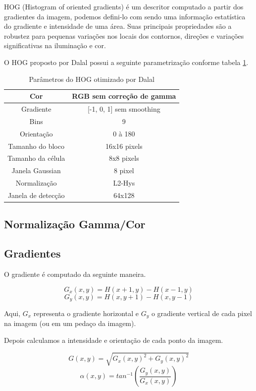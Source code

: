 HOG (Histogram of oriented gradients) é um descritor computado a partir dos gradientes da imagem, podemos defini-lo com sendo uma informação estatística do gradiente e intensidade de uma área. Suas principais propriedades são a robustez para pequenas variações nos locais dos contornos, direções e variações significativas na iluminação e cor.

O HOG proposto por Dalal \cite{dalal} possui a seguinte parametrização conforme tabela \ref{table:dlal_hog}.

\begin{table}[h]
\centering
\begin{tabular}{|c|c|}
\hline Cor & RGB sem correção de gamma \\ 
\hline Gradiente & [-1, 0, 1] sem smoothing \\ 
\hline Bins & 9 \\
\hline Orientação & 0 à 180 \\
\hline Tamanho do bloco & 16x16 pixels \\
\hline Tamanho da célula & 8x8 pixels \\
\hline Janela Gaussian & 8 pixel \\
\hline Normalização & L2-Hys \\
\hline Janela de detecção & 64x128 \\
\hline 
\end{tabular} 
\caption{Parâmetros do HOG otimizado por Dalal}
\label{table:dlal_hog}
\end{table}

\subsection{Normalização Gamma/Cor}

\subsection{Gradientes}

O gradiente é computado da seguinte maneira.

\[G_{x}(x,y) = H(x+1, y) - H(x-1, y)\]
\[G_{y}(x,y) = H(x, y+1) - H(x, y-1)\]

Aqui, \(G_{x}\) representa o gradiente horizontal e \(G_{y}\) o gradiente vertical de cada pixel na imagem (ou em um pedaço da imagem).

Depois calculamos a intensidade e orientação de cada ponto da imagem.

\[G(x,y) = \sqrt{G_{x}(x,y)^{2} + G_{y}(x,y)^{2}}\]
\[\alpha (x,y) = tan^{-1} \left(\frac{G_{y}(x,y)}{G_{x}(x,y)}\right)\]


